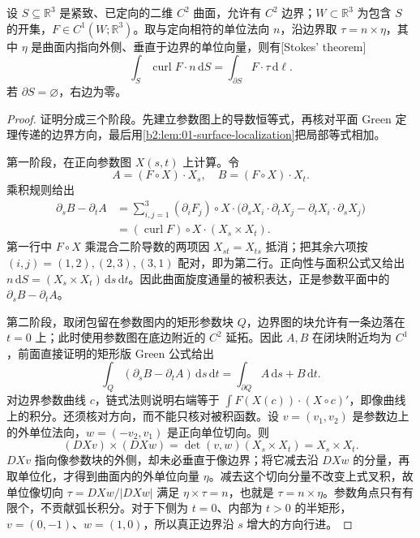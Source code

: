 \begin{theorem}[Stokes]\label{b2:thm:01-vector-stokes}
设 \(S\subseteq\mathbb R^3\) 是紧致、已定向的二维 \(C^2\) 曲面，允许有 \(C^2\) 边界；\(W\subset\mathbb R^3\) 为包含 \(S\) 的开集，\(F\in C^1(W;\mathbb R^3)\)。取与定向相符的单位法向 \(n\)，沿边界取 \(\tau=n\times\eta\)，其中 \(\eta\) 是曲面内指向外侧、垂直于边界的单位向量，则有[Stokes' theorem]
\begin{equation}\label{b2:eq:01-vector-stokes}
 \int_S\operatorname{curl}F\cdot n\,\mathrm dS
 =\int_{\partial S}F\cdot\tau\,\mathrm d\ell.
\end{equation}
若 \(\partial S=\varnothing\)，右边为零。
\end{theorem}
\begin{proof}
证明分成三个阶段。先建立参数图上的导数恒等式，再核对平面 Green 定理传递的边界方向，最后用\cref{b2:lem:01-surface-localization}把局部等式相加。

第一阶段，在正向参数图 \(X(s,t)\) 上计算。令
\[
 A=(F\circ X)\cdot X_s,\quad B=(F\circ X)\cdot X_t.
\]
乘积规则给出
\[
 \begin{aligned}
 \partial_sB-\partial_tA
 &=\sum_{i,j=1}^3(\partial_iF_j)\circ X
     \cdot\bigl(\partial_sX_i\cdot\partial_tX_j
                 -\partial_tX_i\cdot\partial_sX_j\bigr)\\
 &=(\operatorname{curl}F)\circ X\cdot(X_s\times X_t).
 \end{aligned}
\]
第一行中 \(F\circ X\) 乘混合二阶导数的两项因 \(X_{st}=X_{ts}\) 抵消；把其余六项按 \((i,j)=(1,2),(2,3),(3,1)\) 配对，即为第二行。正向性与面积公式又给出 \(n\,\mathrm dS=(X_s\times X_t)\,\mathrm ds\,\mathrm dt\)。因此曲面旋度通量的被积表达，正是参数平面中的 \(\partial_sB-\partial_tA\)。

第二阶段，取闭包留在参数图内的矩形参数块 \(Q\)，边界图的块允许有一条边落在 \(t=0\) 上；此时使用参数图在底边附近的 \(C^2\) 延拓。因此 \(A,B\) 在闭块附近均为 \(C^1\)，前面直接证明的矩形版 Green 公式给出
\[
 \int_Q(\partial_sB-\partial_tA)\,\mathrm ds\,\mathrm dt
 =\int_{\partial Q}A\,\mathrm ds+B\,\mathrm dt.
\]
对边界参数曲线 \(c\)，链式法则说明右端等于 \(\int F(X(c))\cdot(X\circ c)'\)，即像曲线上的积分。还须核对方向，而不能只核对被积函数。设 \(v=(v_1,v_2)\) 是参数边上的外单位法向，\(w=(-v_2,v_1)\) 是正向单位切向。则
\[
 (DXv)\times(DXw)=\det(v,w)(X_s\times X_t)
 =X_s\times X_t.
\]
\(DXv\) 指向像参数块的外侧，却未必垂直于像边界；将它减去沿 \(DXw\) 的分量，再取单位化，才得到曲面内的外单位向量 \(\eta\)。减去这个切向分量不改变上式叉积，故单位像切向 \(\tau=DXw/|DXw|\) 满足 \(\eta\times\tau=n\)，也就是 \(\tau=n\times\eta\)。参数角点只有有限个，不贡献弧长积分。对于下侧为 \(t=0\)、内部为 \(t>0\) 的半矩形，\(v=(0,-1)\)、\(w=(1,0)\)，所以真正边界沿 \(s\) 增大的方向行进。


\end{proof}

